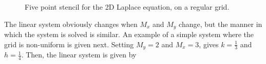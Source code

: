 \newcommand{\stencilpt}[4][]{\node[circle,fill,draw,inner sep=1.5pt,label={above left:#4},#1] at (#2) (#3) {}}
\begin{figure}[t]
\centering
{}
\caption{Five point stencil for the 2D Laplace equation, on a regular grid. }
\label{stencil}
\end{figure}

The linear system obviously changes when $M_x$ and $M_y$ change, but the manner in which the system is solved is similar. An example of a simple system where the grid is non-uniform is given next. Setting $M_y = 2$ and $M_x = 3$, gives $k = \frac{1}{3}$ and $h = \frac{1}{4}$. Then, the linear system is given by


